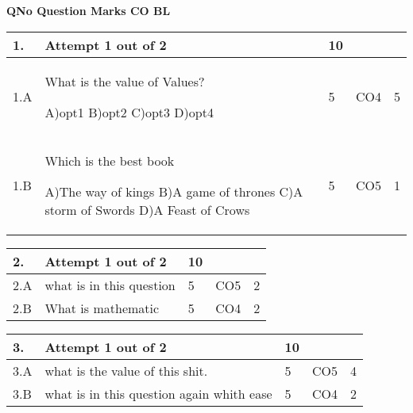 \documentclass[12pt]{article}
\begin{document}
	\begin{flushleft}
	\bf{QNo}\hspace{1.2cm} \bf{Question} \hspace{5.5cm}  \bf{Marks} \hspace{0.2cm} \bf{CO} \hspace{0.2cm}	\bf{BL}	
	
\end{flushleft} 
	\begin{longtable}{|L{1cm}|L{8cm}|C{1cm}|C{1cm}|C{1cm}|}\hline
		\bf{1}. & \bf{Attempt} \bf1 \bf{out} of \bf2 & \bf10  & & \\ \hline
				1.A & What is the value of Values? \newline
					
		A)opt1\newline
		B)opt2\newline
		C)opt3\newline
		D)opt4 &
		5 &
		CO4&
		5 \\ \hline
		
				1.B & Which is the best book \newline
					
		A)The way of kings\newline
		B)A game of thrones\newline
		C)A storm of Swords\newline
		D)A Feast of Crows &
		5 &
		CO5&
		1 \\ \hline
		
		
	\end{longtable}

	\begin{longtable}{|L{1cm}|L{8cm}|C{1cm}|C{1cm}|C{1cm}|}\hline
	\bf2. & \bf{Attempt} \bf{1} \bf{out of} \bf{2} & \bf{10}  & & \\ \hline





		2.A &
	what is in this question \newline
			
	 &  5 & CO5 & 2\\ \hline
		2.B &
	What is mathematic \newline
			
	 &  5 & CO4 & 2\\ \hline
	\end{longtable}


\begin{longtable}{|L{1cm}|L{8cm}|C{1cm}|C{1cm}|C{1cm}|}\hline
	\bf3. & \bf{Attempt} \bf{1} \bf{out of} \bf{2} & \bf{10}  & & \\ \hline





		3.A &
	what is the value of this shit. \newline
			
	 &  5 & CO5 & 4\\ \hline
		3.B &
	what is in this question again whith ease \newline
			
	 &  5 & CO4 & 2\\ \hline
	\end{longtable}
\end{document}
